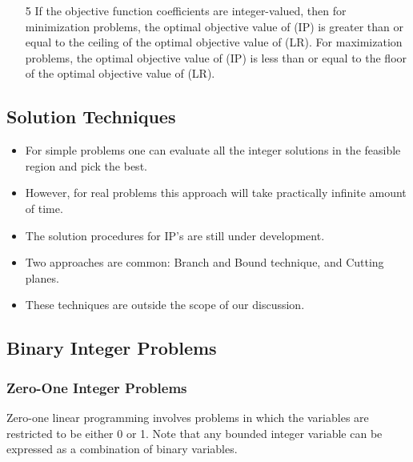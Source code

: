 \documentclass{beamer}
\begin{document}
\begin{frame} 
\begin{itemize}
\item[5] If the objective function coefficients are integer-valued, then for minimization
	problems, the optimal objective value of (IP) is greater than
	or equal to the ceiling of the optimal objective value of (LR). For maximization
	problems, the optimal objective value of (IP) is less than or
	equal to the floor of the optimal objective value of (LR). 
\end{itemize}
\end{frame}
\subsection{Solution Techniques}
\begin{frame}
\begin{itemize}
\item For simple problems one
	can evaluate all the integer solutions in the feasible region and pick the best. 
\item However, for real problems
	this approach will take practically infinite amount of time. 
\item The solution procedures for IP’s are still under
	development. 
\item Two approaches are common: Branch and Bound technique, and Cutting planes. 
\item These
	techniques are outside the scope of our discussion.
\end{itemize}

\end{frame}
\subsection{Binary Integer Problems}
\begin{frame}
\frametitle{Zero-One Integer Problems}
	Zero-one linear programming involves problems in which the variables are restricted to be either 0 or 1. Note that any bounded integer variable can be expressed as a combination of binary variables.
\end{frame}
\end{document}
